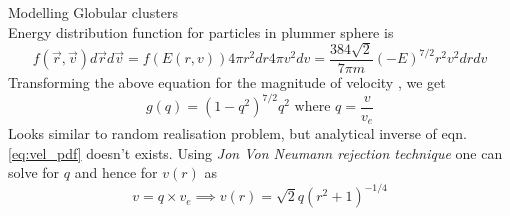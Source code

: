 \documentclass[final]{beamer}
\newlength{\colwidth}
\begin{document}
\begin{frame}[t]
\begin{columns}[t]
\begin{column}{\colwidth}
\begin{block}{Modelling Globular clusters}
 \\
Energy distribution function for particles in plummer sphere is 
\begin{equation}
    f(\Vec{r},\Vec{v})d\Vec{r}d\Vec{v} = f(E(r,v))4\pi r^2 dr 4\pi v^2 dv = \displaystyle{\frac{384\sqrt{2}}{7\pi m}} (-E)^{7/2} r^2 v^2 dr dv  
\end{equation}
Transforming the above equation for the magnitude of velocity , we get 
\begin{equation}\label{eq:vel_pdf}
    g(q) = (1 - q^2)^{7/2}q^2 \text{ where } q = \displaystyle{\frac{v}{v_e}}
\end{equation}
Looks similar to random realisation problem, but analytical inverse of eqn.\ref{eq:vel_pdf} doesn't exists. Using \textit{Jon Von Neumann rejection technique} one can solve for $q$ and hence for $v(r)$ as 
\begin{equation}
    \boxed{v = q \times v_e \implies v(r) = \sqrt{2} q (r^2 + 1)^{-1/4}}
\end{equation}

  \end{block}

 


 
    





\end{column}
\end{columns}
\end{frame}
\end{document}
